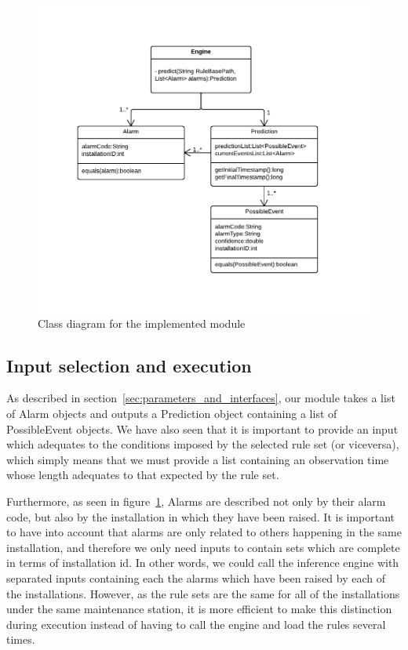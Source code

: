 \documentclass[a4paper,12pt]{article}
\begin{document}
\begin{figure}[hbtp]
\includegraphics[width=\textwidth]{img/prototypeArchitecture.pdf}
\caption{Class diagram for the implemented module} \label{fig:prototypeArchitecture}
\end{figure}

\subsection{Input selection and execution}
As described in section~\ref{sec:parameters_and_interfaces}, our module takes a list of Alarm objects and outputs a Prediction object containing a list of PossibleEvent objects. We have also seen that it is important to provide an input which adequates to the conditions imposed by the selected rule set (or viceversa), which simply means that we must provide a list containing an observation time whose length adequates to that expected by the rule set.

Furthermore, as seen in figure~\ref{fig:prototypeArchitecture}, Alarms are described not only by their alarm code, but also by the installation in which they have been raised. It is important to have into account that alarms are only related to others happening in the same installation, and therefore we only need inputs to contain sets which are complete in terms of installation id. In other words, we could call the inference engine with separated inputs containing each the alarms which have been raised by each of the installations. However, as the rule sets are the same for all of the installations under the same maintenance station, it is more efficient to make this distinction during execution instead of having to call the engine and load the rules several times.
\end{document}
